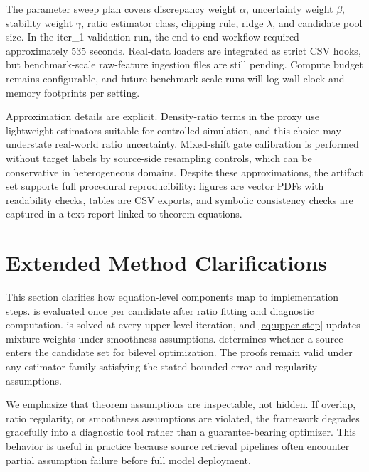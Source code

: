 \documentclass{article} %
\begin{document}
The parameter sweep plan covers discrepancy weight \(\alpha\), uncertainty weight \(\beta\), stability weight \(\gamma\), ratio estimator class, clipping rule, ridge \(\lambda\), and candidate pool size. In the iter\_1 validation run, the end-to-end workflow required approximately \(535\) seconds. Real-data loaders are integrated as strict CSV hooks, but benchmark-scale raw-feature ingestion files are still pending. Compute budget remains configurable, and future benchmark-scale runs will log wall-clock and memory footprints per setting.

Approximation details are explicit. Density-ratio terms in the proxy use lightweight estimators suitable for controlled simulation, and this choice may understate real-world ratio uncertainty. Mixed-shift gate calibration is performed without target labels by source-side resampling controls, which can be conservative in heterogeneous domains. Despite these approximations, the artifact set supports full procedural reproducibility: figures are vector PDFs with readability checks, tables are CSV exports, and symbolic consistency checks are captured in a text report linked to theorem equations.

\section{Extended Method Clarifications}
This section clarifies how equation-level components map to implementation steps.  is evaluated once per candidate after ratio fitting and diagnostic computation.  is solved at every upper-level iteration, and \eqref{eq:upper-step} updates mixture weights under smoothness assumptions.  determines whether a source enters the candidate set for bilevel optimization. The proofs remain valid under any estimator family satisfying the stated bounded-error and regularity assumptions.

We emphasize that theorem assumptions are inspectable, not hidden. If overlap, ratio regularity, or smoothness assumptions are violated, the framework degrades gracefully into a diagnostic tool rather than a guarantee-bearing optimizer. This behavior is useful in practice because source retrieval pipelines often encounter partial assumption failure before full model deployment.
\end{document}

